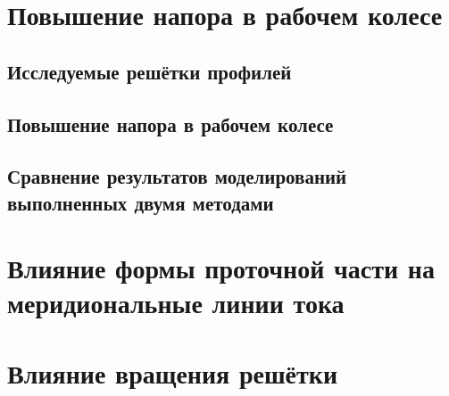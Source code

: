 \section{Повышение напора в рабочем колесе}
	\subsection{Исследуемые решётки профилей}
	\subsection{Повышение напора в рабочем колесе}
	\subsection{Сравнение результатов моделирований выполненных двумя методами}
	
\section{Влияние формы проточной части на меридиональные линии тока}
\section{Влияние вращения решётки}

\FloatBarrier
